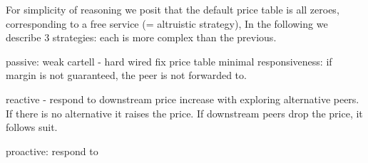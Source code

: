 \documentclass[a4paper,10pt,fullpage]{article}
\numberwithin{equation}{section}
\theoremstyle{definition}
\begin{document}
For simplicity of reasoning we posit that the default price table is all zeroes, corresponding to a free service (= altruistic strategy),
In the following we describe 3 strategies: each is more complex than the previous.

passive: weak cartell - hard wired fix price table
minimal responsiveness: if margin is not guaranteed, the peer is not forwarded to. 

reactive - respond to downstream price increase with exploring alternative peers. If there is no alternative it raises the price. If downstream peers drop the price, it follows suit.

proactive: respond to 




\end{document}
